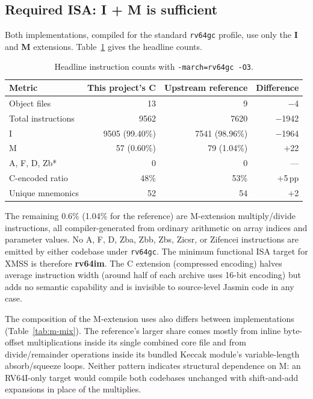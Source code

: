 \documentclass[11pt,a4paper]{article}
\begin{document}
\subsection{Required ISA: I + M is sufficient}

Both implementations, compiled for the standard \texttt{rv64gc}
profile, use only the \textbf{I} and \textbf{M} extensions.
Table~\ref{tab:isa-headline} gives the headline counts.

\begin{table}[ht]
\centering
\caption{Headline instruction counts with \texttt{-march=rv64gc -O3}.}
\label{tab:isa-headline}
\begin{tabular}{@{}lrrr@{}}
\toprule
Metric                & This project's C & Upstream reference & Difference \\
\midrule
Object files          & 13   & 9    & $-$4 \\
Total instructions    & 9562 & 7620 & $-$1942 \\
\quad I               & 9505 (99.40\%) & 7541 (98.96\%) & $-$1964 \\
\quad M               &   57 (0.60\%)  &   79 (1.04\%)  & $+$22  \\
A, F, D, Zb*          & 0    & 0    & --- \\
C-encoded ratio       & 48\% & 53\% & $+$5\,pp \\
Unique mnemonics      & 52   & 54   & $+$2 \\
\bottomrule
\end{tabular}
\end{table}

The remaining 0.6\% (1.04\% for the reference) are M-extension
multiply/divide instructions, all compiler-generated from ordinary
arithmetic on array indices and parameter values. No A, F, D, Zba,
Zbb, Zbs, Zicsr, or Zifencei instructions are emitted by either
codebase under \texttt{rv64gc}. The minimum functional ISA target
for XMSS is therefore \textbf{rv64im}. The C extension (compressed
encoding) halves average instruction width (around half of each
archive uses 16-bit encoding) but adds no semantic capability and
is invisible to source-level Jasmin code in any case.

The composition of the M-extension uses also differs between
implementations (Table~\ref{tab:m-mix}). The reference's larger
share comes mostly from inline byte-offset multiplications inside
its single combined core file and from divide/remainder operations
inside its bundled Keccak module's variable-length absorb/squeeze
loops. Neither pattern indicates structural dependence on M: an
RV64I-only target would compile both codebases unchanged with
shift-and-add expansions in place of the multiplies.
\end{document}
